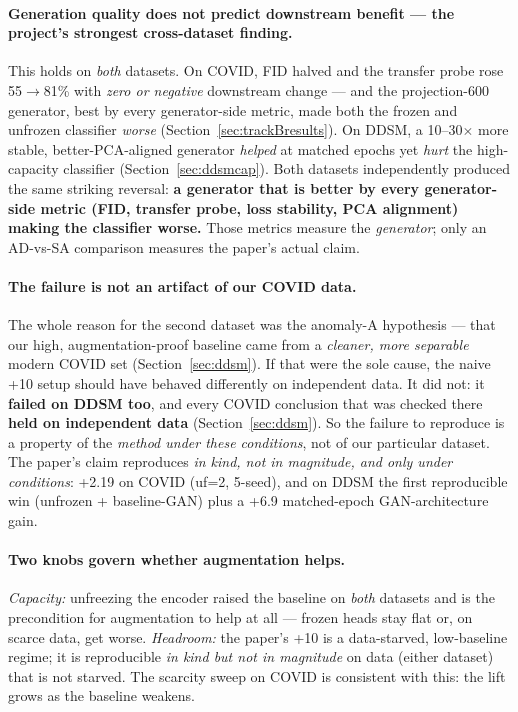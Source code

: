 \documentclass[11pt]{article}
\begin{document}
\paragraph{Generation quality does not predict downstream benefit --- the project's
strongest cross-dataset finding.} This holds on \emph{both} datasets. On COVID, FID
halved and the transfer probe rose 55$\to$81\% with \emph{zero or negative}
downstream change --- and the projection-600 generator, best by every generator-side
metric, made both the frozen and unfrozen classifier \emph{worse}
(Section~\ref{sec:trackBresults}). On DDSM, a 10--30$\times$ more stable,
better-PCA-aligned generator \emph{helped} at matched epochs yet \emph{hurt} the
high-capacity classifier (Section~\ref{sec:ddsmcap}). Both datasets independently
produced the same striking reversal: \textbf{a generator that is better by every
generator-side metric (FID, transfer probe, loss stability, PCA alignment) making the
classifier worse.} Those metrics measure the \emph{generator}; only an AD-vs-SA
comparison measures the paper's actual claim.

\paragraph{The failure is not an artifact of our COVID data.} The whole reason for
the second dataset was the anomaly-A hypothesis --- that our high, augmentation-proof
baseline came from a \emph{cleaner, more separable} modern COVID set
(Section~\ref{sec:ddsm}). If that were the sole cause, the naive +10 setup should have
behaved differently on independent data. It did not: it \textbf{failed on DDSM too},
and every COVID conclusion that was checked there \textbf{held on independent data}
(Section~\ref{sec:ddsm}). So the failure to reproduce is a property of the
\emph{method under these conditions}, not of our particular dataset. The paper's claim
reproduces \emph{in kind, not in magnitude, and only under conditions}: +2.19 on COVID
(uf=2, 5-seed), and on DDSM the first reproducible win (unfrozen + baseline-GAN) plus a
+6.9 matched-epoch GAN-architecture gain.

\paragraph{Two knobs govern whether augmentation helps.} \emph{Capacity:} unfreezing
the encoder raised the baseline on \emph{both} datasets and is the precondition for
augmentation to help at all --- frozen heads stay flat or, on scarce data, get worse.
\emph{Headroom:} the paper's +10 is a data-starved, low-baseline regime; it is
reproducible \emph{in kind but not in magnitude} on data (either dataset) that is not
starved. The scarcity sweep on COVID is consistent with this: the lift grows as the
baseline weakens.
\end{document}
